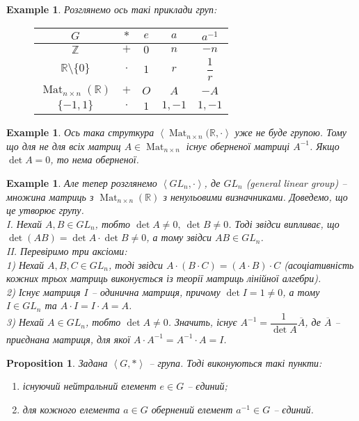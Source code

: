 \documentclass[a4paper, 10pt]{article}
\theoremstyle{theoremdd}
\theoremstyle{theoremdd}
\theoremstyle{theoremdd}
\theoremstyle{theoremdd}
\theoremstyle{theoremdd}
\newtheorem{example}[theorem]{Example}
\theoremstyle{theoremdd}
\theoremstyle{theoremdd}
\theoremstyle{theoremdd}
\theoremstyle{theoremdd}
\newtheorem{proposition}[theorem]{Proposition}
\theoremstyle{theoremdd}
\theoremstyle{theoremdd}
\theoremstyle{theoremdd}
\theoremstyle{theoremdd}
\theoremstyle{theoremdd}
\theoremstyle{theoremdd}
\DeclareMathOperator{\Mat}{Mat}
\begin{document}
\begin{example}
Розглянемо ось такі приклади груп:
\begin{figure}[H]
\centering
\begin{tabular}{c|c|c|c|c}
$G$ & $*$ & $e$ & $a$ & $a^{-1}$ \\
\hline
$\mathbb{Z}$ & $+$ & $0$ & $n$ & $-n$ \\
$\mathbb{R} \setminus \{0\}$ & $\cdot$ & $1$ & $r$ & $\dfrac{1}{r}$ \\
$\Mat_{n \times n}(\mathbb{R})$ & $+$ & $O$ & $A$ & $-A$ \\
$\{-1,1\}$ & $\cdot$ & $1$ & $1,-1$ & $1,-1$
\end{tabular}
\end{figure}
\end{example}

\begin{example}
Ось така струткура $\left< \Mat_{n \times n}(\mathbb{R}, \cdot \right>$ уже не буде групою. Тому що для не для всіх матриц $A \in \Mat_{n \times n}$ існує оберненої матриці $A^{-1}$. Якщо $\det A = 0$, то нема оберненої.
\end{example}

\begin{example}
Але тепер розглянемо $\left< GL_n, \cdot \right>$, де $GL_n$ (general linear group) -- множина матриць з $\Mat_{n \times n}(\mathbb{R})$ з ненульовими визначниками. Доведемо, що це утворює групу.\\
I. Нехай $A,B \in GL_n$, тобто $\det A \neq 0,\ \det B \neq 0$. Тоді звідси випливає, що $\det (AB) = \det A \cdot \det B \neq 0$, а тому звідси $AB \in GL_n$.\\
II. Перевіримо три аксіоми:\\
1) Нехай $A,B,C \in GL_n$, тоді звідси $A \cdot (B \cdot C) = (A \cdot B) \cdot C$ (асоціативність кожних трьох матриць виконується із теорії матриць лінійної алгебри).\\
2) Існує матриця $I$ -- одинична матриця, причому $\det I = 1 \neq 0$, а тому $I \in GL_n$ та $A \cdot I = I \cdot A = A$.\\
3) Нехай $A \in GL_n$, тобто $\det A \neq 0$. Значить, існує $A^{-1} = \dfrac{1}{\det A} \overline{A}$, де $\overline{A}$ -- приєднана матриця, для якої $A \cdot A^{-1} = A^{-1} \cdot A = I$.
\end{example}

\begin{proposition}
Задана $\left<G,* \right>$ -- група. Тоді виконуються такі пункти:
\begin{enumerate}[nosep,wide=0pt, label={\arabic*)}]
\item існуючий нейтральний елемент $e \in G$ -- єдиний;
\item для кожного елемента $a \in G$ обернений елемент $a^{-1} \in G$ -- єдиний.
\end{enumerate}
\end{proposition}
\end{document}
